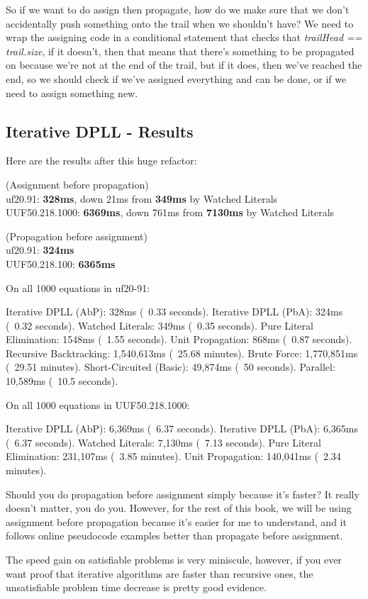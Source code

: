 So if we want to do assign then propagate, how do we make sure that 
we don't accidentally push something onto the trail when we shouldn't have?
We need to wrap the assigning code in a conditional statement that checks that 
\textit{trailHead == trail.size}, if it doesn't, then that means that there's 
something to be propagated on because we're not at the end of the trail, but 
if it does, then we've reached the end, so we should check if we've assigned 
everything and can be done, or if we need to assign something new.

\subsection{Iterative DPLL - Results}
Here are the results after this huge refactor:

(Assignment before propagation)\\
uf20.91: \textbf{328ms}, down 21ms from \textbf{349ms} by Watched Literals\\
UUF50.218.1000: \textbf{6369ms}, down 761ms from \textbf{7130ms} by Watched Literals

(Propagation before assignment)\\
uf20.91: \textbf{324ms}\\
UUF50.218.100: \textbf{6365ms}

\begin{FVerbatim}
On all 1000 equations in uf20-91:

Iterative DPLL (AbP):      328ms (~0.33 seconds).
Iterative DPLL (PbA):      324ms (~0.32 seconds).
Watched Literals:          349ms (~0.35 seconds).
Pure Literal Elimination:  1548ms (~1.55 seconds).
Unit Propagation:          868ms (~0.87 seconds).
Recursive Backtracking:    1,540,613ms (~25.68 minutes).
Brute Force:               1,770,851ms (~29.51 minutes).
Short-Circuited (Basic):   49,874ms (~50 seconds).
Parallel:                  10,589ms (~10.5 seconds).

On all 1000 equations in UUF50.218.1000:

Iterative DPLL (AbP):     6,369ms (~6.37 seconds).
Iterative DPLL (PbA):     6,365ms (~6.37 seconds).
Watched Literals:         7,130ms (~7.13 seconds).
Pure Literal Elimination: 231,107ms (~3.85 minutes).
Unit Propagation:         140,041ms (~2.34 minutes).
\end{FVerbatim}

Should you do propagation before assignment simply because it's faster? It 
really doesn't matter, you do you. However, for the rest of this book, we will be 
using assignment before propagation because it's easier for me to understand, and it 
follows online pseudocode examples better than propagate before assignment.

The speed gain on satisfiable problems is very miniscule, however, if you ever want 
proof that iterative algorithms are faster than recursive ones, the unsatisfiable 
problem time decrease is pretty good evidence.